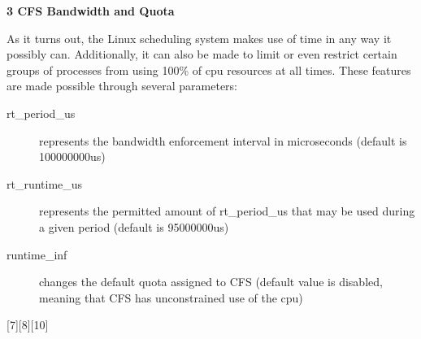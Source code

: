 \vspace{1pc}

\noindent\textbf{3 CFS Bandwidth and Quota}

\vspace{1pc}

As it turns out, the Linux scheduling system makes use of time in any way it possibly can. Additionally, it can also be made to limit or even restrict certain groups of processes from using 100\% of cpu resources at all times. These features are made possible through several parameters:
\begin{description}
	\item [rt\_period\_us] represents the bandwidth enforcement interval in microseconds (default is 100000000us)
	\item [rt\_runtime\_us] represents the permitted amount of rt\_period\_us that may be used during a given period (default is 95000000us)
	\item [runtime\_inf] changes the default quota assigned to CFS (default value is disabled, meaning that CFS has unconstrained use of the cpu)
\end{description}

[7][8][10]